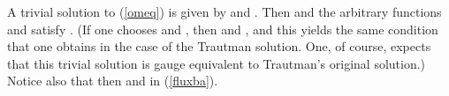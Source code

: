 \documentclass[a4paper,twocolumn,prd,showpacs,amsmath,amssymb]{revtex4}
\begin{document}
A trivial solution to (\ref{omeq}) is given by \coordHE{} and \coordHE{}.
Then \coordHE{} and
the arbitrary functions \coordHE{} and \coordHE{} satisfy \coordHE{}.
(If one chooses \coordHE{} and \coordHE{}, then \coordHE{}
and \coordHE{}, and this yields the same condition that one obtains
in the case of the Trautman solution. One, of course, expects that this trivial
solution is gauge equivalent to Trautman's original solution.) Notice also that
then \coordHE{} and
\coordHE{} in \coordHE{} (\ref{fluxba}).

\subsection{\label{g0d0} \coordHE{}}
\end{document}
